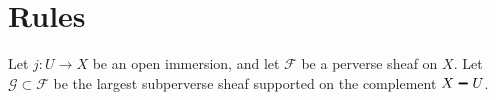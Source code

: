 \documentclass{amsart}
\newcommand{\sm}{\raisebox{2.33pt}{~\rule{6.4pt}{1.3pt}~}}
\begin{document}
\section{Rules}

Let $j\colon U\to X$ be an open immersion, and let ${\mathcal F}$ be a perverse sheaf on $X$.  Let ${\mathcal G}\subset {\mathcal F}$ be the largest subperverse sheaf supported on the complement $X\sm U$.
\end{document}
